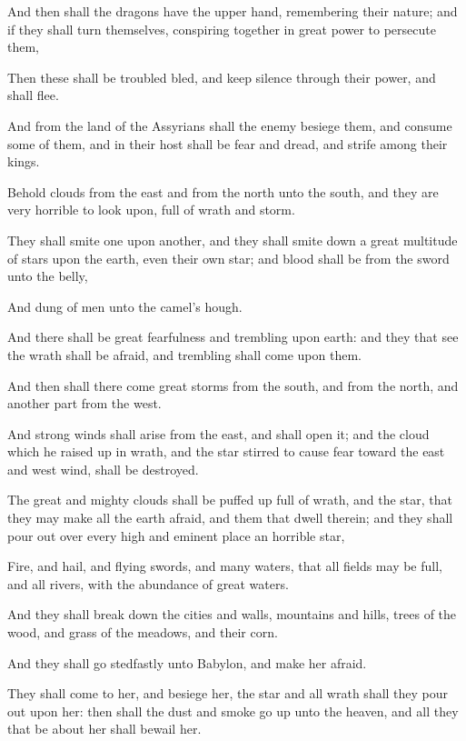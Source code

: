 {\par }{\PP {}And then shall the dragons have the upper hand, remembering their nature; and if they shall turn themselves, conspiring together in great power to persecute them,
\par }{\PP {}Then these shall be troubled bled, and keep silence through their power, and shall flee.
\par }{\PP {}And from the land of the Assyrians shall the enemy besiege them, and consume some of them, and in their host shall be fear and dread, and strife among their kings.
\par }{\PP {}Behold clouds from the east and from the north unto the south, and they are very horrible to look upon, full of wrath and storm.
\par }{\PP {}They shall smite one upon another, and they shall smite down a great multitude of stars upon the earth, even their own star; and blood shall be from the sword unto the belly,
\par }{\PP {}And dung of men unto the camel’s hough.
\par }{\PP {}And there shall be great fearfulness and trembling upon earth: and they that see the wrath shall be afraid, and trembling shall come upon them.
\par }{\PP {}And then shall there come great storms from the south, and from the north, and another part from the west.
\par }{\PP {}And strong winds shall arise from the east, and shall open it; and the cloud which he raised up in wrath, and the star stirred to cause fear toward the east and west wind, shall be destroyed.
\par }{\PP {}The great and mighty clouds shall be puffed up full of wrath, and the star, that they may make all the earth afraid, and them that dwell therein; and they shall pour out over every high and eminent place an horrible star,
\par }{\PP {}Fire, and hail, and flying swords, and many waters, that all fields may be full, and all rivers, with the abundance of great waters.
\par }{\PP {}And they shall break down the cities and walls, mountains and hills, trees of the wood, and grass of the meadows, and their corn.
\par }{\PP {}And they shall go stedfastly unto Babylon, and make her afraid.
\par }{\PP {}They shall come to her, and besiege her, the star and all wrath shall they pour out upon her: then shall the dust and smoke go up unto the heaven, and all they that be about her shall bewail her.
}
